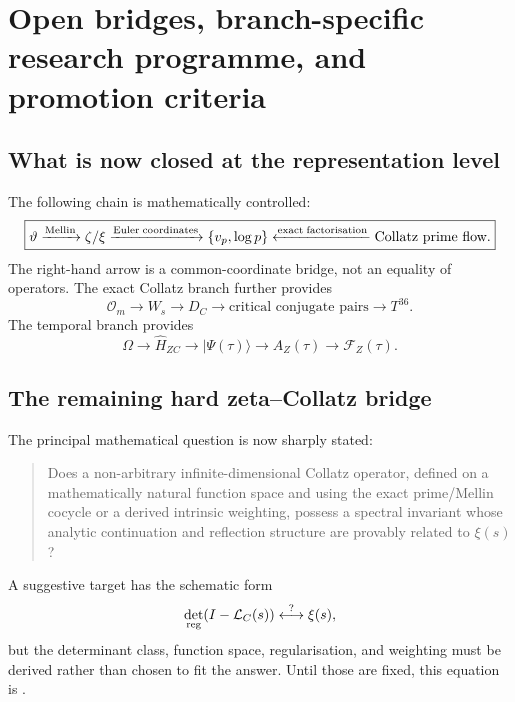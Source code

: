 \section{Open bridges, branch-specific research programme, and promotion criteria}

\subsection{What is now closed at the representation level}

The following chain is mathematically controlled:
\begin{equation}
\boxed{
\vartheta
\xrightarrow{\rm Mellin}
\zeta/\xi
\xrightarrow{\rm Euler\;coordinates}
\{v_p,\log p\}
\xleftarrow{\rm exact\;factorisation}
\text{Collatz prime flow}.
}
\end{equation}
The right-hand arrow is a common-coordinate bridge, not an equality of operators. The exact Collatz branch further provides
\begin{equation}
\boxed{
\mathcal O_m
\longrightarrow
W_s
\longrightarrow
D_C
\longrightarrow
\text{critical conjugate pairs}
\longrightarrow
T^{36}.
}
\end{equation}
The temporal branch provides
\begin{equation}
\boxed{
\Omega
\longrightarrow
\hat H_{ZC}
\longrightarrow
|\Psi(\tau)\rangle
\longrightarrow
A_Z(\tau)
\longrightarrow
\mathcal F_Z(\tau).
}
\end{equation}

\subsection{The remaining hard zeta--Collatz bridge}

The principal mathematical question is now sharply stated:
\begin{quote}
Does a non-arbitrary infinite-dimensional Collatz operator, defined on a mathematically natural function space and using the exact prime/Mellin cocycle or a derived intrinsic weighting, possess a spectral invariant whose analytic continuation and reflection structure are provably related to \(\xi(s)\)?
\end{quote}
A suggestive target has the schematic form
\begin{equation}
\det_{\rm reg}(I-\mathcal L_C(s))
\stackrel{?}{\longleftrightarrow}
\xi(s),
\end{equation}
but the determinant class, function space, regularisation, and weighting must be derived rather than chosen to fit the answer. Until those are fixed, this equation is .


